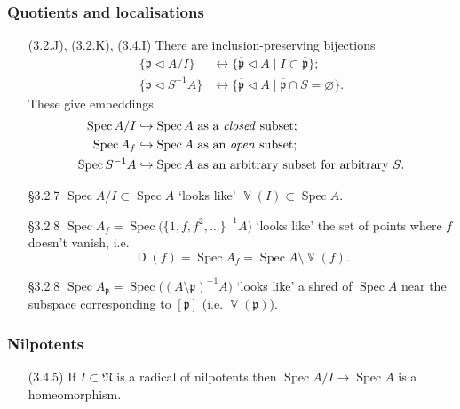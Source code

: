 \documentclass[10pt]{article}
\DeclareMathOperator{\Spec}{Spec}
\DeclareMathOperator{\V}{\mathbb{V}}
\DeclareMathOperator{\D}{D}
\newcommand{\prid}{\mathfrak{p}}
\newcommand{\nilr}{\mathfrak{N}}
\newcommand{\ideal}{\triangleleft}
\begin{document}
            \subsubsection{Quotients and localisations}
            
                \begin{itemize}
                    \item[(3.2.J), (3.2.K), (3.4.I)] There are inclusion-preserving bijections
                        \begin{align*}
                            \{\prid\ideal A/I\} &\leftrightarrow \{\overline{\prid}\ideal A \mid I\subset\overline{\prid}\};\\
                            \{\prid\ideal S^{-1}A\} &\leftrightarrow \{\overline{\prid}\ideal A \mid \overline{\prid}\cap S=\varnothing\}.
                        \end{align*}
                        These give embeddings
                        \begin{align*}
                            \Spec A/I &\hookrightarrow \Spec A\text{ as a \textit{closed} subset;}\\
                            \Spec A_f &\hookrightarrow \Spec A\text{ as an \textit{open} subset;}\\
                            \Spec S^{-1}A &\hookrightarrow \Spec A\text{ as an arbitrary subset for arbitrary }S\text{.}
                        \end{align*}
                    \item[§3.2.7] $\Spec A/I\subset\Spec A$ `looks like' $\V(I)\subset \Spec A$.
                    \item[§3.2.8] $\Spec A_f=\Spec\big(\{1,f,f^2,\ldots\}^{-1}A\big)$ `looks like' the set of points where $f$ doesn't vanish, i.e. \[\D(f)=\Spec A_f=\Spec A\setminus\V(f).\]
                    \item[§3.2.8] $\Spec A_\prid=\Spec\big((A\setminus\prid)^{-1}A\big)$ `looks like' a shred of $\Spec A$ near the subspace corresponding to $[\prid]$ (i.e. $\V(\prid)$).
                \end{itemize}
            
            \subsubsection{Nilpotents}
            
                \begin{itemize}
                    \item[(3.4.5)] If $I\subset\nilr$ is a radical of nilpotents then $\Spec A/I\to\Spec A$ is a homeomorphism.
                \end{itemize}
            
\end{document}
